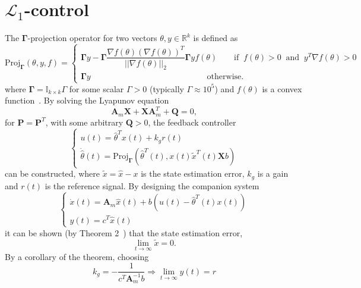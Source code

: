 \documentclass{article}
\begin{document}
\section{$\mathcal{L}_1$-control}
The $\mathbf{\Gamma}$-projection operator for two vectors $\theta,y\in\mathbb{R}^k$ is defined as
\begin{equation}
\text{Proj}_{\mathbf{\Gamma}}(\theta,y,f) =
\begin{cases}
\mathbf{\Gamma} y - \mathbf{\Gamma}\dfrac{\nabla f(\theta)(\nabla f(\theta))^T}{||\nabla f(\theta)||_2}\mathbf{\Gamma} yf(\theta)\qquad
\text{if}\;\;f(\theta)>0\;\;\text{and}\;\;y^T\nabla f(\theta)>0\\
\mathbf{\Gamma} y\qquad\qquad\qquad\qquad\qquad\qquad\quad\quad\text{otherwise}.
\end{cases}
\end{equation}
where $\mathbf{\Gamma} = \mathbb{I}_{k\times k}\Gamma$ for some scalar $\Gamma > 0$ (typically $\Gamma\approx 10^5$) and $f(\theta)$ is a convex function~\cite{lavretsky2011projection}. By solving the Lyapunov equation
\begin{equation}
\mathbf{A}_m\mathbf{X}+ \mathbf{X}\mathbf{A}_m^T+ \mathbf{Q} = 0,
\end{equation}
for $\mathbf{P}=\mathbf{P}^T$, with some arbitrary $\mathbf{Q}>0$, the feedback controller
\begin{equation}
\begin{cases}
u(t)=\hat{\theta}^Tx(t)+k_gr(t)\\
\dot{\hat{\theta}}(t) = \text{Proj}_{\mathbf{\Gamma}}(\hat{\theta}^T(t),x(t)\tilde{x}^T(t)\mathbf{X}b)
\end{cases}
\end{equation}
can be constructed, where $\tilde{x} = \hat{x} - x$ is the state estimation error, $k_g$ is a gain and $r(t)$ is the reference signal. By designing the companion system
\begin{equation}
\begin{cases}
\dot{x}(t) = \mathbf{A}_m\hat{x}(t) + b(u(t)-\hat{\theta}^T(t)x(t))\\
y(t) = c^T\hat{x}(t)
\end{cases}
\end{equation}
it can be shown (by Theorem 2~\cite{cao2006design}) that the state estimation error,
\begin{equation}
\lim_{t\rightarrow\infty}\tilde{x} = 0.
\end{equation}
By a corollary of the theorem, choosing
\begin{equation}
k_g =-\frac{1}{c^T\mathbf{A}_m^{-1}b} \Rightarrow \lim_{t\rightarrow\infty}y(t) = r
\end{equation}
\end{document}
